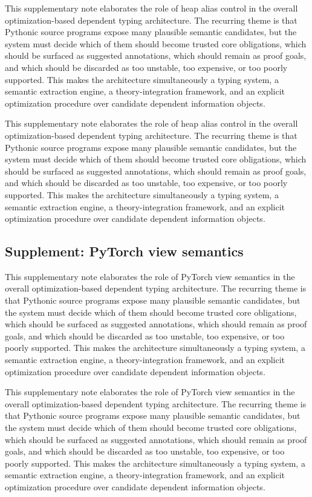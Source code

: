 \documentclass[11pt]{article}
\theoremstyle{definition}
\theoremstyle{plain}
\begin{document}
This supplementary note elaborates the role of heap alias control in the overall
optimization-based dependent typing architecture. The recurring theme is that
Pythonic source programs expose many plausible semantic candidates, but the
system must decide which of them should become trusted core obligations, which
should be surfaced as suggested annotations, which should remain as proof
goals, and which should be discarded as too unstable, too expensive, or too
poorly supported. This makes the architecture simultaneously a typing system,
a semantic extraction engine, a theory-integration framework, and an explicit
optimization procedure over candidate dependent information objects.

This supplementary note elaborates the role of heap alias control in the overall
optimization-based dependent typing architecture. The recurring theme is that
Pythonic source programs expose many plausible semantic candidates, but the
system must decide which of them should become trusted core obligations, which
should be surfaced as suggested annotations, which should remain as proof
goals, and which should be discarded as too unstable, too expensive, or too
poorly supported. This makes the architecture simultaneously a typing system,
a semantic extraction engine, a theory-integration framework, and an explicit
optimization procedure over candidate dependent information objects.

\subsection{Supplement: PyTorch view semantics}
This supplementary note elaborates the role of PyTorch view semantics in the overall
optimization-based dependent typing architecture. The recurring theme is that
Pythonic source programs expose many plausible semantic candidates, but the
system must decide which of them should become trusted core obligations, which
should be surfaced as suggested annotations, which should remain as proof
goals, and which should be discarded as too unstable, too expensive, or too
poorly supported. This makes the architecture simultaneously a typing system,
a semantic extraction engine, a theory-integration framework, and an explicit
optimization procedure over candidate dependent information objects.

This supplementary note elaborates the role of PyTorch view semantics in the overall
optimization-based dependent typing architecture. The recurring theme is that
Pythonic source programs expose many plausible semantic candidates, but the
system must decide which of them should become trusted core obligations, which
should be surfaced as suggested annotations, which should remain as proof
goals, and which should be discarded as too unstable, too expensive, or too
poorly supported. This makes the architecture simultaneously a typing system,
a semantic extraction engine, a theory-integration framework, and an explicit
optimization procedure over candidate dependent information objects.
\end{document}
